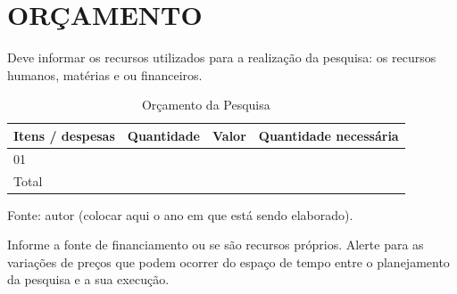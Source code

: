 \section{ORÇAMENTO}
Deve informar os recursos utilizados para a realização da pesquisa: os recursos humanos, matérias e ou financeiros.

\begin{table}[h]
    \centering
    \caption{Orçamento da Pesquisa}
    
    \label{tab:orcamento}
    \begin{tabular}{|l|l|l|l|}
        \hline
        Itens / despesas & Quantidade & Valor & Quantidade necessária \\ \hline
        01 & & & \\ \hline
        Total & & & \\ \hline
    \end{tabular}
    \vspace{0.2cm}
    
    {\small Fonte: autor (colocar aqui o ano em que está sendo elaborado).}
\end{table}

Informe a fonte de financiamento ou se são recursos próprios. Alerte para as variações de preços que podem ocorrer do espaço de tempo entre o planejamento da pesquisa e a sua execução.